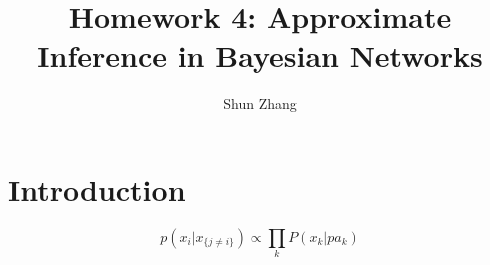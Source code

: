 \documentclass[11pt]{article}
\title{Homework 4: Approximate Inference in Bayesian Networks}
\author{Shun Zhang}
\date{}
\begin{document}
\maketitle

\section{Introduction}

\begin{equation}
p(x_i|x_{\{j \not = i\}}) \propto \prod_k P(x_k|pa_k)
\end{equation}

\end{document}
